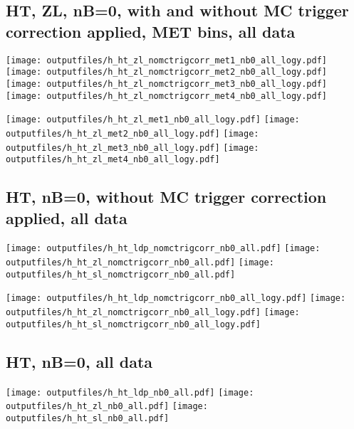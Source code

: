 \documentclass[11pt]{article}
\begin{document}
   \clearpage
     \subsection{ HT, ZL, nB=0, with and without MC trigger correction applied, MET bins, all data}

    \noindent
     \texttt{[image: outputfiles/h\_ht\_zl\_nomctrigcorr\_met1\_nb0\_all\_logy.pdf]}
     \texttt{[image: outputfiles/h\_ht\_zl\_nomctrigcorr\_met2\_nb0\_all\_logy.pdf]}
     \texttt{[image: outputfiles/h\_ht\_zl\_nomctrigcorr\_met3\_nb0\_all\_logy.pdf]}
     \texttt{[image: outputfiles/h\_ht\_zl\_nomctrigcorr\_met4\_nb0\_all\_logy.pdf]}

    \noindent
     \texttt{[image: outputfiles/h\_ht\_zl\_met1\_nb0\_all\_logy.pdf]}
     \texttt{[image: outputfiles/h\_ht\_zl\_met2\_nb0\_all\_logy.pdf]}
     \texttt{[image: outputfiles/h\_ht\_zl\_met3\_nb0\_all\_logy.pdf]}
     \texttt{[image: outputfiles/h\_ht\_zl\_met4\_nb0\_all\_logy.pdf]}

   \clearpage
    \subsection{ HT, nB=0, without MC trigger correction applied, all data}

    \noindent
    \texttt{[image: outputfiles/h\_ht\_ldp\_nomctrigcorr\_nb0\_all.pdf]}
    \texttt{[image: outputfiles/h\_ht\_zl\_nomctrigcorr\_nb0\_all.pdf]}
    \texttt{[image: outputfiles/h\_ht\_sl\_nomctrigcorr\_nb0\_all.pdf]}

    \noindent
    \texttt{[image: outputfiles/h\_ht\_ldp\_nomctrigcorr\_nb0\_all\_logy.pdf]}
    \texttt{[image: outputfiles/h\_ht\_zl\_nomctrigcorr\_nb0\_all\_logy.pdf]}
    \texttt{[image: outputfiles/h\_ht\_sl\_nomctrigcorr\_nb0\_all\_logy.pdf]}


    \subsection{ HT, nB=0, all data}

    \noindent
    \texttt{[image: outputfiles/h\_ht\_ldp\_nb0\_all.pdf]}
    \texttt{[image: outputfiles/h\_ht\_zl\_nb0\_all.pdf]}
    \texttt{[image: outputfiles/h\_ht\_sl\_nb0\_all.pdf]}
\end{document}
